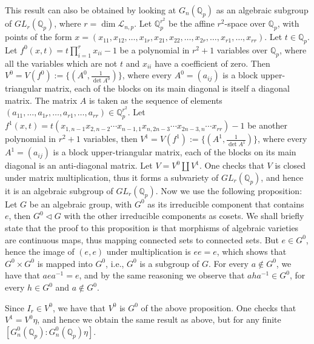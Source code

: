 \documentclass{article}
\begin{document}
This result can also be obtained by looking at $G_{n}(\mathbb{Q}_{p})$ as an algebraic subgroup of $GL_{r}(\mathbb{Q}_{p})$, where $r=\dim\mathcal{L}_{n,p}$. Let $\mathbb{Q}_{p}^{r^2}$ be the affine $r^2$-space over $\mathbb{Q}_{p}$, with points of the form $x=(x_{11},x_{12},\dots,x_{1r},x_{21},x_{22},\dots,x_{2r},\dots,x_{r1},\dots,x_{rr})$. Let $t\in\mathbb{Q}_{p}$. Let $f^{0}(x,t)=t\prod_{i=1}^{r}x_{ii}-1$ be a polynomial in $r^2+1$ variables over $\mathbb{Q}_{p}$, where all the variables which are not $t$ and $x_{ii}$ have a coefficient of zero. Then $V^{0}=V(f^{0}):=\{(A^{0},\frac{1}{\det{A^{0}}})\}$, where every $A^{0}=(a_{ij})$ is a block upper-triangular matrix, each of the blocks on its main diagonal is itself a diagonal matrix. The matrix $A$ is taken as the sequence of elements $(a_{11},\dots,a_{1r},\dots,a_{r1},\dots,a_{rr})\in\mathbb{Q}_{p}^{r^2}$. Let $f^{1}(x,t)=t(x_{1,n-1}x_{2,n-2}\cdots{x_{n-1,1}}x_{n,2n-3}\cdots{x_{2n-3,n}}\cdots{x_{rr}})-1$ be another polynomial in $r^2+1$ variables, then $V^{1}=V(f^{1}):=\{(A^{1},\frac{1}{\det{A^{1}}})\}$, where every $A^{1}=(a_{ij})$ is a block upper-triangular matrix, each of the blocks on its main diagonal is an anti-diagonal matrix.
Let $V=V^{0}\coprod{V^{1}}$. One checks that $V$ is closed under matrix multiplication, thus it forms a subvariety of $GL_{r}(\mathbb{Q}_{p})$, and hence it is an algebraic subgroup of $GL_{r}(\mathbb{Q}_{p})$. Now we use the following proposition: Let $G$ be an algebraic group, with $G^{0}$ as its irreducible component that contains $e$, then $G^{0}\triangleleft{G}$ with the other irreducible components as cosets. We shall briefly state that the proof to this proposition is that morphisms of algebraic varieties are continuous maps, thus mapping connected sets to connected sets. But $e\in{G^{0}}$, hence the image of $(e,e)$ under multiplication is $ee=e$, which shows that $G^{0}\times{G^{0}}$ is mapped into $G^{0}$, i.e., $G^{0}$ is a subgroup of $G$. For every $a\notin{G^{0}}$, we have that $aea^{-1}=e$, and by the same reasoning we observe that $aha^{-1}\in{G^{0}}$, for every $h\in{G^{0}}$ and $a\notin{G^{0}}$.

Since $I_{r}\in{V^{0}}$, we have that $V^{0}$ is $G^{0}$ of the above proposition. One checks that $V^{1}=V^{0}\eta$, and hence we obtain the same result as above, but for any finite $[G^{0}_{n}(\mathbb{Q}_{p}):G^{0}_{n}(\mathbb{Q}_{p})\eta]$.
\end{document}

